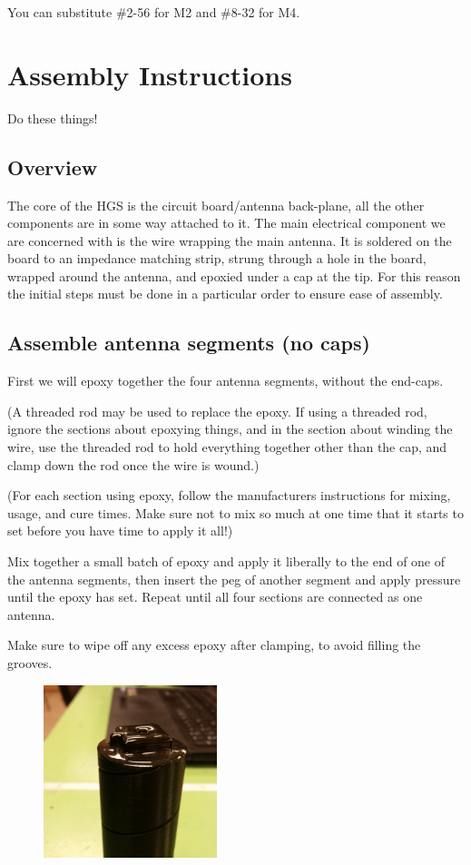 \documentclass[paper=a4,parskip=full+]{scrartcl}
\begin{document}
\noindent You can substitute \#2-56 for M2 and \#8-32 for M4.

\newpage
\section{Assembly Instructions}
Do these things!
\subsection{Overview}
The core of the HGS is the circuit board/antenna back-plane, all the other components are in some way attached to it. The main electrical component we are concerned with is the wire wrapping the main antenna. It is soldered on the board to an impedance matching strip, strung through a hole in the board, wrapped around the antenna, and epoxied under a cap at the tip. For this reason the initial steps must be done in a particular order to ensure ease of assembly.

\subsection{Assemble antenna segments (no caps)}
First we will epoxy together the four antenna segments, without the end-caps.

(A threaded rod may be used to replace the epoxy. If using a threaded rod, ignore the sections about epoxying things, and in the section about winding the wire, use the threaded rod to hold everything together other than the cap, and clamp down the rod once the wire is wound.)

(For each section using epoxy, follow the manufacturers instructions for mixing, usage, and cure times. Make sure not to mix so much at one time that it starts to set before you have time to apply it all!)

Mix together a small batch of epoxy and apply it liberally to the end of one of the antenna segments, then insert the peg of another segment and apply pressure until the epoxy has set. Repeat until all four sections are connected as one antenna.

Make sure to wipe off any excess epoxy after clamping, to avoid filling the grooves.

\begin{figure}[H]
    \centering
    \includegraphics[width=0.45\textwidth]{Epoxy.jpg} 
\end{figure}
\end{document}
